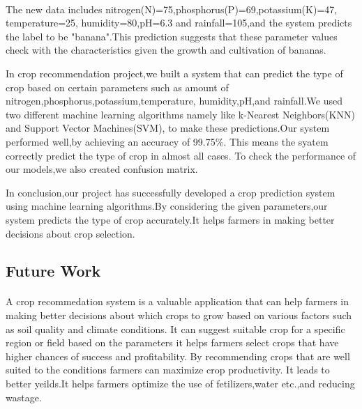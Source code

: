 \paragraph{}The new data includes nitrogen(N)=75,phosphorus(P)=69,potassium(K)=47,
temperature=25,
humidity=80,pH=6.3 and rainfall=105,and the system predicts the label to be "banana".This prediction suggests that these parameter values check with the characteristics given the growth and cultivation of bananas.\par In crop recommendation project,we built a system that can predict the type of crop based on certain parameters such as amount of nitrogen,phosphorus,potassium,temperature,
humidity,pH,and rainfall.We used two different machine learning algorithms namely like k-Nearest Neighbors(KNN) and Support Vector Machines(SVM), to make these predictions.Our system performed well,by achieving an accuracy of 99.75\%. This means the syatem correctly predict the type of crop in almost all cases. To check the performance of our models,we also created confusion matrix.\par
In conclusion,our project has successfully developed a crop prediction system using machine learning algorithms.By considering the given parameters,our system predicts the type of crop accurately.It helps farmers in making better decisions about crop selection.

\subsection{Future Work}
\paragraph{} A crop recommedation system is a valuable application that can help farmers in making better decisions about which crops to grow based on various factors such as soil quality and climate conditions. It can suggest suitable crop for a specific region or field based on the parameters it helps farmers select crops that have higher chances of success and profitability. By recommending crops that are well suited to the conditions farmers can maximize crop productivity. It leads to better yeilds.It helps farmers optimize the use of fetilizers,water etc.,and reducing wastage.